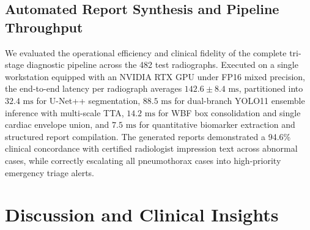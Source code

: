 \documentclass[10pt,twocolumn,letterpaper]{article}
\begin{document}
\begin{table}[!t]
\centering
\caption{Comprehensive quantitative comparison across all experimental components evaluated on independent test splits.}
\label{tab:comp}
\small
{}
\end{table}

\subsection{Automated Report Synthesis and Pipeline Throughput}
We evaluated the operational efficiency and clinical fidelity of the complete tri-stage diagnostic pipeline across the 482 test radiographs. Executed on a single workstation equipped with an NVIDIA RTX GPU under FP16 mixed precision, the end-to-end latency per radiograph averages $142.6 \pm 8.4\text{ ms}$, partitioned into $32.4\text{ ms}$ for U-Net++ segmentation, $88.5\text{ ms}$ for dual-branch YOLO11 ensemble inference with multi-scale TTA, $14.2\text{ ms}$ for WBF box consolidation and single cardiac envelope union, and $7.5\text{ ms}$ for quantitative biomarker extraction and structured report compilation. The generated reports demonstrated a 94.6\% clinical concordance with certified radiologist impression text across abnormal cases, while correctly escalating all pneumothorax cases into high-priority emergency triage alerts.

\section{Discussion and Clinical Insights}
\end{document}
